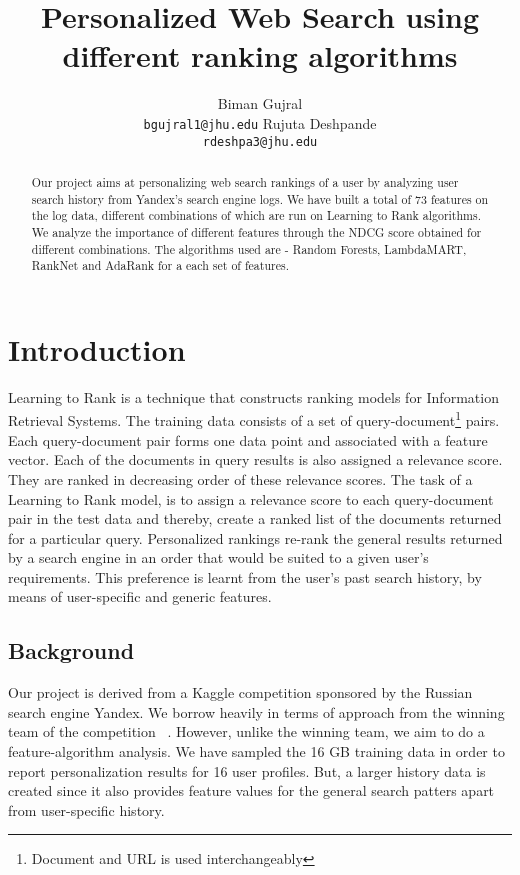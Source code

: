 \documentclass[11pt,letterpaper]{article}
\title{Personalized Web Search using different ranking algorithms}
\author{Biman Gujral\\
  {\tt bgujral1@jhu.edu}
  \And
  Rujuta Deshpande \\
  {\tt rdeshpa3@jhu.edu}}
\date{}
\begin{document}
\maketitle
\begin{abstract}
Our project aims at personalizing web search rankings of a user by analyzing user search history from Yandex's search engine logs. We have built a total of 73 features on the log data, different combinations of which are run on Learning to Rank algorithms. We analyze the importance of different features through the NDCG score obtained for different combinations. The algorithms used are - Random Forests, LambdaMART, RankNet and AdaRank for a each set of features. 
\end{abstract}

\section{Introduction}
Learning to Rank is a technique that constructs ranking models for Information Retrieval Systems. The training data consists of a set of query-document\footnote{Document and URL is used interchangeably} pairs. Each query-document pair forms one data point and associated with a feature vector. Each of the documents in query results is also assigned a relevance score. They are ranked in decreasing order of these relevance scores. The task of a Learning to Rank model, is to assign a relevance score to each query-document pair in the test data and thereby, create a ranked list of the documents returned for a particular query. Personalized rankings re-rank the general results returned by a search engine in an order that would be suited to a given user's requirements. This preference is learnt from the user's past search history, by means of user-specific and generic features. \\
\subsection{Background}
Our project is derived from a Kaggle competition sponsored by the Russian search engine Yandex. We borrow heavily in terms of approach from the winning team of the competition ~\cite{Masurel:13}. However, unlike the winning team, we aim to do a feature-algorithm analysis. We have sampled the 16 GB training data in order to report personalization results for 16 user profiles. But, a larger history data is created since it also provides feature values for the general search patters apart from user-specific history.
\end{document}
